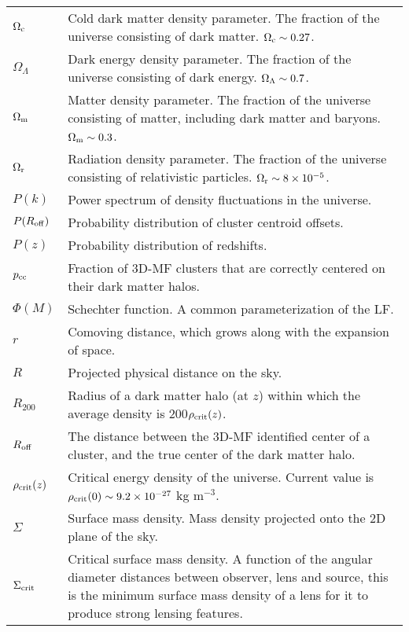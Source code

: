 \section*{\underline{}}
\vspace{-0.5cm}
\begin{tabular}{p{0.6in}p{5.8in}}

$\Omega_{\rm c}$ & Cold dark matter density parameter. The fraction of the universe consisting of dark matter. $\Omega_{\rm c} \sim 0.27$. \\
$\Omega_{\Lambda}$ & Dark energy density parameter. The fraction of the universe consisting of dark energy. $\Omega_{\rm \Lambda} \sim 0.7$. \\
$\Omega_{\rm m}$ & Matter density parameter. The fraction of the universe consisting of matter, including dark matter and baryons. $\Omega_{\rm m} \sim 0.3$. \\
$\Omega_{\rm r}$ & Radiation density parameter. The fraction of the universe consisting of relativistic particles. $\Omega_{\rm r} \sim 8 \times 10^{-5}$. \\
$P(k)$ & Power spectrum of density fluctuations in the universe. \\
$P(R_{\rm off})$ & Probability distribution of cluster centroid offsets. \\
$P(z)$ & Probability distribution of redshifts. \\
$p_{\rm cc}$ & Fraction of \acs{3D-MF} clusters that are correctly centered on their dark matter halos. \\
$\Phi(M)$ & Schechter function. A common parameterization of the \acs{LF}. \\
$r$ & Comoving distance, which grows along with the expansion of space. \\
$R$ & Projected physical distance on the sky. \\
$R_{200}$ & Radius of a dark matter halo (at $z$) within which the average density is 200$\rho_{\rm crit}(z)$. \\
$R_{\rm off}$ & The distance between the \acs{3D-MF} identified center of a cluster, and the true center of the dark matter halo. \\
$\rho_{\rm crit}(z)$ & Critical energy density of the universe. Current value is $\rho_{\rm crit}(0) \sim 9.2 \times 10^{-27}$ kg m$^{-3}$. \\
$\Sigma$ & Surface mass density. Mass density projected onto the 2D plane of the sky. \\
$\Sigma_{\rm crit}$ & Critical surface mass density. A function of the angular diameter distances between observer, lens and source, this is the minimum surface mass density of a lens for it to produce strong lensing features. \\

\end{tabular}
